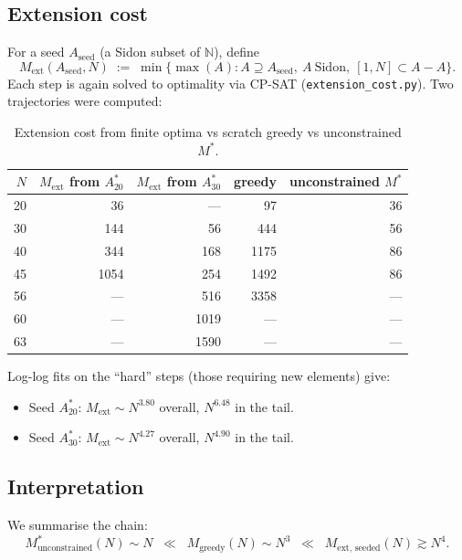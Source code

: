 \documentclass[11pt]{article}
\begin{document}
\subsection{Extension cost}

For a seed $A_{\text{seed}}$ (a Sidon subset of $\mathbb{N}$), define
\[
   M_{\text{ext}}(A_{\text{seed}}, N)
   \;:=\; \min\bigl\{ \max(A) : A \supseteq A_{\text{seed}},\
                     A\ \text{Sidon},\ [1, N] \subset A - A \bigr\}.
\]
Each step is again solved to optimality via CP-SAT
(\texttt{extension\_cost.py}). Two trajectories were computed:

\begin{table}[ht]
\centering
\begin{tabular}{r r r r r}
\toprule
$N$ & $M_{\text{ext}}$ from $A_{20}^*$ & $M_{\text{ext}}$ from $A_{30}^*$ & greedy & unconstrained $M^*$ \\
\midrule
20 & 36     & ---    &   97 & 36 \\
30 & 144    & 56     &  444 & 56 \\
40 & 344    & 168    & 1175 & 86 \\
45 & 1054   & 254    & 1492 & 86 \\
56 & ---    & 516    & 3358 & --- \\
60 & ---    & 1019   & ---  & --- \\
63 & ---    & 1590   & ---  & --- \\
\bottomrule
\end{tabular}
\caption{Extension cost from finite optima vs scratch greedy vs unconstrained $M^*$.}
\label{tab:ext}
\end{table}

Log-log fits on the ``hard'' steps (those requiring new elements) give:
\begin{itemize}
\item Seed $A_{20}^*$: $M_{\text{ext}} \sim N^{3.80}$ overall, $N^{6.48}$ in the tail.
\item Seed $A_{30}^*$: $M_{\text{ext}} \sim N^{4.27}$ overall, $N^{4.90}$ in the tail.
\end{itemize}

\subsection{Interpretation}

We summarise the chain:
\begin{equation}\label{eq:chain}
   M^*_{\text{unconstrained}}(N) \sim N
   \;\;\ll\;\;
   M_{\text{greedy}}(N) \sim N^3
   \;\;\ll\;\;
   M_{\text{ext, seeded}}(N) \gtrsim N^4.
\end{equation}
\end{document}
